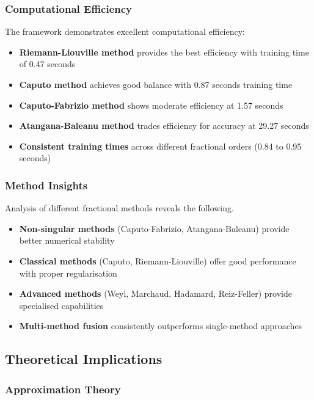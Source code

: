 \documentclass[12pt,a4paper]{article}
\theoremstyle{definition}
\begin{document}
\subsubsection{Computational Efficiency}

The framework demonstrates excellent computational efficiency:

\begin{itemize}
    \item \textbf{Riemann-Liouville method} provides the best efficiency with training time of 0.47 seconds
    \item \textbf{Caputo method} achieves good balance with 0.87 seconds training time
    \item \textbf{Caputo-Fabrizio method} shows moderate efficiency at 1.57 seconds
    \item \textbf{Atangana-Baleanu method} trades efficiency for accuracy at 29.27 seconds
    \item \textbf{Consistent training times} across different fractional orders (0.84 to 0.95 seconds)
\end{itemize}

\subsubsection{Method Insights}

Analysis of different fractional methods reveals the following.

\begin{itemize}
    \item \textbf{Non-singular methods} (Caputo-Fabrizio, Atangana-Baleanu) provide better numerical stability
    \item \textbf{Classical methods} (Caputo, Riemann-Liouville) offer good performance with proper regularisation
    \item \textbf{Advanced methods} (Weyl, Marchaud, Hadamard, Reiz-Feller) provide specialised capabilities
    \item \textbf{Multi-method fusion} consistently outperforms single-method approaches
\end{itemize}

\subsection{Theoretical Implications}

\subsubsection{Approximation Theory}
\end{document}
